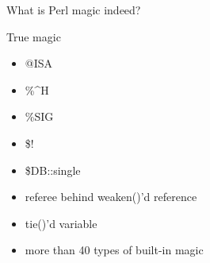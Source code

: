 \documentclass[mathserif,hyperref={urlcolor=cyan,colorlinks=true}]{beamer}
\begin{document}
\begin{frame}{What is Perl magic indeed?}
\begin{figure}
\end{figure}
\end{frame}

\begin{frame}{True magic}
\begin{itemize}
\item<1-> @ISA
\item<1-> \%\^{}H
\item<1-> \%SIG
\item<1-> \$!
\item<1-> \$DB::single
\item<2-> referee behind weaken()'d reference
\item<3-> tie()'d variable
\item<4-> more than 40 types of built-in magic
\end{itemize}
\end{frame}
\end{document}

